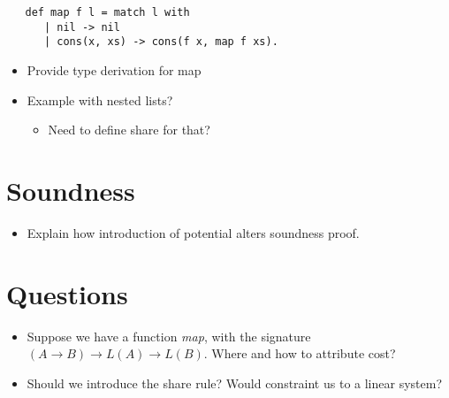 \begin{verbatim}
   def map f l = match l with 
      | nil -> nil
      | cons(x, xs) -> cons(f x, map f xs).
\end{verbatim}

\begin{itemize}
   \item Provide type derivation for map
   \item Example with nested lists?
      \begin{itemize}
         \item Need to define share for that?
      \end{itemize}
\end{itemize}

\section{Soundness}
\begin{itemize}
   \item Explain how introduction of potential alters soundness proof.
\end{itemize}

\section{Questions}

\begin{itemize}
   \item Suppose we have a function \emph{map}, with the signature \((A \to B) \to L(A) \to L(B)\). Where and how to attribute cost?
   \item Should we introduce the share rule? Would constraint us to a linear system?
\end{itemize}

